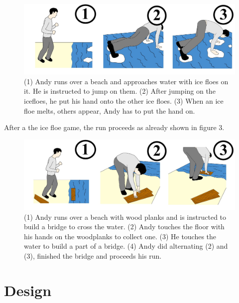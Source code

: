\documentclass[twocolumn,showpacs,%
  nofootinbib,aps,superscriptaddress,%
  eqsecnum,prd,notitlepage,showkeys,10pt]{revtex4-1}
\begin{document}
\begin{figure}[!htb]
  \includegraphics[width=\linewidth]{graphics/Image(13).jpg}
\endminipage\hfill
  \caption{(1) Andy runs over a beach and approaches water with ice floes on it. He is instructed to jump on them. (2) After jumping on the icefloes, he put his hand onto the other ice floes. (3) When an ice floe melts, others appear, Andy has to put the hand on.}\label{fig:awesome_image3}
\end{figure}


After a the ice floe game, the run proceeds as already shown in figure 3.

\begin{figure}[!htb]
  \includegraphics[width=\linewidth]{graphics/Image(14).jpg}
\endminipage\hfill
  \caption{(1) Andy runs over a beach with wood planks and is instructed to build a bridge to cross the water. (2) Andy touches the floor with his hands on the woodplanks to collect one. (3) He touches the water to build a part of a bridge. (4) Andy did alternating (2) and (3), finished the bridge and proceeds his run.}\label{fig:awesome_image3}
\end{figure}


\section{Design}
\end{document}
